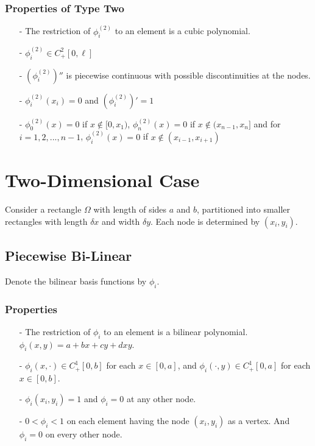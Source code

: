 \documentclass[../../main.tex]{subfiles}
\begin{document}
\subsubsection{Properties of Type Two}
\begin{itemize}
	\item[-] The restriction of $\phi^{(2)}_i$ to an element is a cubic polynomial.
	\item[-] $\phi^{(2)}_i \in C^2_+[0,\ell]$
	\item[-] $(\phi^{(2)}_i)''$ is piecewise continuous with possible discontinuities at the nodes.
	\item[-] $\phi^{(2)}_i(x_i) = 0$ and $(\phi^{(2)}_i)' = 1$
	\item[-] $\phi^{(2)}_0(x) = 0$ if $x \notin [0,x_1)$, $\phi^{(2)}_n(x) = 0$ if $x \notin (x_{n-1},x_n]$ and for $i = 1,2,...,n-1$, $\phi^{(2)}_i(x) = 0$ if $x \notin (x_{i-1},x_{i+1})$
\end{itemize}

\section*{Two-Dimensional Case}
Consider a rectangle $\Omega$ with length of sides $a$ and $b$, partitioned into smaller rectangles with length $\delta x$ and width $\delta y$. Each node is determined by $(x_i,y_i)$.
\subsection*{Piecewise Bi-Linear}
Denote the bilinear basis functions by $\phi_i$.

\subsubsection{Properties}
\begin{itemize}
	\item[-] The restriction of $\phi_i$ to an element is a bilinear polynomial. $\phi_i(x,y) = a + bx + cy + dxy$.
	\item[-] $\phi_i(x,\cdot) \in C^1_+[0,b]$ for each $x \in [0,a]$, and $\phi_i(\cdot,y) \in C^1_+[0,a]$ for each $x \in [0,b]$.
	\item[-] $\phi_i(x_i,y_i) = 1$ and $\phi_i = 0$ at any other node.
	\item[-] $0 < \phi_i < 1$ on each element having the node $(x_i,y_i)$ as a vertex. And $\phi_i = 0$ on every other node.
\end{itemize}
\end{document}
